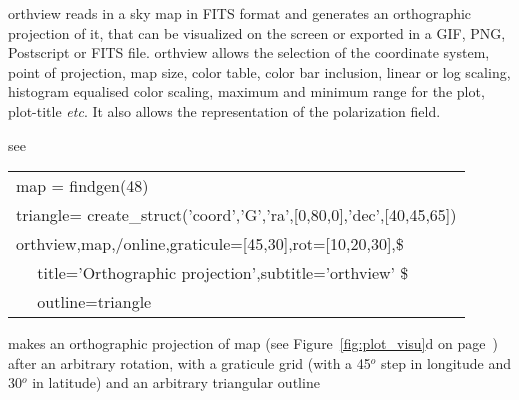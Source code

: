 \begin{codedescription}
{orthview reads in a \healpix sky map in FITS format and generates an
orthographic projection of it, that can be visualized on the screen or
exported in a GIF, PNG, Postscript or FITS file. orthview allows the selection of
the coordinate system, point of projection, map size, color table, color bar inclusion,
linear or log scaling, histogram equalised
color scaling, maximum and 
minimum range for the plot, plot-title {\it etc}. It also allows the representation of the
polarization field. }
\end{codedescription}

%
\begin{related}
  \begin{sulist}{} %
  \item[{\ }] see 
  \end{sulist}
\end{related}




\begin{example}
{
\begin{tabular}{l} %

map  = findgen(48) \\
triangle= create\_struct('coord','G','ra',[0,80,0],'dec',[40,45,65]) \\
orthview,map,/online,graticule=[45,30],rot=[10,20,30],\$ \\
$\quad$	   title='Orthographic projection',subtitle='orthview' \$ \\
$\quad$          outline=triangle \\
\end{tabular}
}
{makes an orthographic projection of map (see Figure~\ref{fig:plot_visu}d on
page~\pageref{page:plot_visu}) after an arbitrary rotation, with a graticule grid
(with a 45$^o$ step in longitude and 30$^o$ in latitude) and an arbitrary triangular outline}
\end{example}
